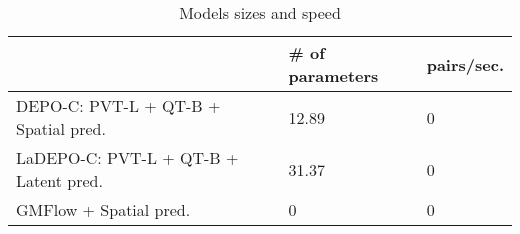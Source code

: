 \begin{table}[h!]
\centering
\caption{Models sizes and speed}
\label{tab:speed}
\begin{tabular}{lll}
\toprule
 & # of parameters & pairs/sec. \\
\midrule
DEPO-C: PVT-L + QT-B + Spatial pred. & 12.89 & 0 \\
LaDEPO-C: PVT-L + QT-B + Latent pred. & 31.37 & 0 \\
GMFlow + Spatial pred. & 0 & 0 \\
\bottomrule
\end{tabular}
\end{table}
